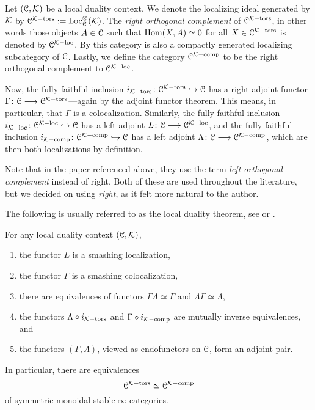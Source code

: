 \begin{construction}
    Let $(\EuScript{C}, \mathcal{K})$ be a local duality context. We denote the localizing ideal generated by $\mathcal{K}$ by $\EuScript{C}^{\mathcal{K}-\mathrm{tors}} := \operatorname{Loc}_{\EuScript{C}}^\otimes(\mathcal{K})$. The \emph{right orthogonal complement} of $\EuScript{C}^{\mathcal{K}-\mathrm{tors}}$, in other words those objects $A\in \EuScript{C}$ such that $\operatorname{Hom}(X, A) \simeq 0$ for all $X\in \EuScript{C}^{\mathcal{K}-\mathrm{tors}}$ is denoted by $\EuScript{C}^{\mathcal{K}-\mathrm{loc}}$. By \cite[2.17]{barthel-heard-valenzuela_2018} this category is also a compactly generated localizing subcategory of $\EuScript{C}$. Lastly, we define the category $\EuScript{C}^{\mathcal{K}-\mathrm{comp}}$ to be the right orthogonal complement to $\EuScript{C}^{\mathcal{K}-\mathrm{loc}}$. 

    Now, the fully faithful inclusion $i_{\mathcal{K}-\mathrm{tors}}\colon\EuScript{C}^{\mathcal{K}-\mathrm{tors}}\hookrightarrow \EuScript{C}$ has a right adjoint functor $\Gamma \colon\EuScript{C}\longrightarrow \EuScript{C}^{\mathcal{K}-\mathrm{tors}}$---again by the adjoint functor theorem. This means, in particular, that $\Gamma$ is a colocalization. Similarly, the fully faithful inclusion $i_{\mathcal{K}-\mathrm{loc}}\colon\EuScript{C}^{\mathcal{K}-\mathrm{loc}}\hookrightarrow \EuScript{C}$ has a left adjoint $L\colon \EuScript{C}\longrightarrow \EuScript{C}^{\mathcal{K}-\mathrm{loc}}$, and the fully faithful inclusion $i_{\mathcal{K}-\mathrm{comp}}\colon\EuScript{C}^{\mathcal{K}-\mathrm{comp}}\hookrightarrow \EuScript{C}$ has a left adjoint $\Lambda\colon\EuScript{C}\longrightarrow \EuScript{C}^{\mathcal{K}-\mathrm{comp}}$, which are then both localizations by definition. 
\end{construction}

\begin{remark}
    Note that in the paper \cite{barthel-heard-valenzuela_2018} referenced above, they use the term \emph{left orthogonal complement} instead of right. Both of these are used throughout the literature, but we decided on using \emph{right}, as it felt more natural to the author. 
\end{remark}

The following is usually referred to as the local duality theorem, see \cite[3.3.5]{hovey-palmiery-strickland_97} or \cite[2.21]{barthel-heard-valenzuela_2018}. 

\begin{theorem}
    \label{ch2:thm:local-duality-co-contra}
    For any local duality context $(\EuScript{C}, \mathcal{K})$, 
    \begin{enumerate}
        \item the functor $L$ is a smashing localization,
        \item the functor $\Gamma$ is a smashing colocalization, 
        \item there are equivalences of functors $\Gamma \Lambda \simeq \Gamma$ and $\Lambda\Gamma \simeq \Lambda$,  
        \item the functors $\Lambda\circ i_{\mathcal{K}-\mathrm{tors}}$ and $\Gamma \circ i_{\mathcal{K}-\mathrm{comp}}$ are mutually inverse equivalences, and 
        \item the functors $(\Gamma, \Lambda)$, viewed as endofunctors on $\EuScript{C}$, form an adjoint pair. 
    \end{enumerate} 
    In particular, there are equivalences
    \[\EuScript{C}^{\mathcal{K}-\mathrm{tors}}\simeq \EuScript{C}^{\mathcal{K}-\mathrm{comp}}\]
    of symmetric monoidal stable $\infty$-categories. 
\end{theorem}

